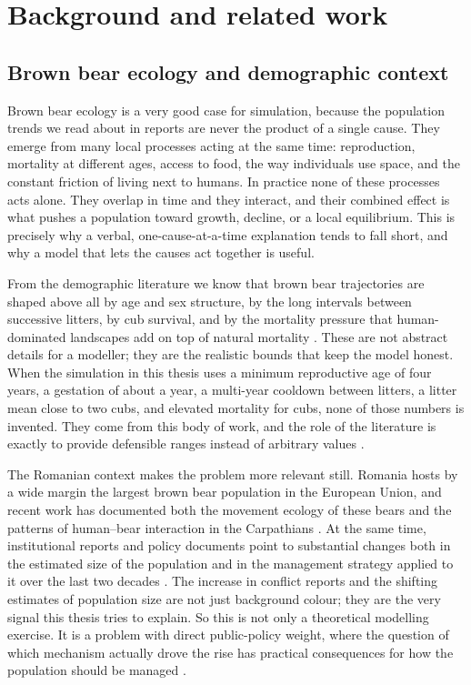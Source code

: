 \chapter{Background and related work}
\label{ch:background_related}

\section{Brown bear ecology and demographic context}

Brown bear ecology is a very good case for simulation, because the population trends we read about in reports are never the product of a single cause. They emerge from many local processes acting at the same time: reproduction, mortality at different ages, access to food, the way individuals use space, and the constant friction of living next to humans. In practice none of these processes acts alone. They overlap in time and they interact, and their combined effect is what pushes a population toward growth, decline, or a local equilibrium. This is precisely why a verbal, one-cause-at-a-time explanation tends to fall short, and why a model that lets the causes act together is useful.

From the demographic literature we know that brown bear trajectories are shaped above all by age and sex structure, by the long intervals between successive litters, by cub survival, and by the mortality pressure that human-dominated landscapes add on top of natural mortality \cite{Schwartz2003,Saether1998,Swenson1997}. These are not abstract details for a modeller; they are the realistic bounds that keep the model honest. When the simulation in this thesis uses a minimum reproductive age of four years, a gestation of about a year, a multi-year cooldown between litters, a litter mean close to two cubs, and elevated mortality for cubs, none of those numbers is invented. They come from this body of work, and the role of the literature is exactly to provide defensible ranges instead of arbitrary values \cite{Swenson2000}.

The Romanian context makes the problem more relevant still. Romania hosts by a wide margin the largest brown bear population in the European Union, and recent work has documented both the movement ecology of these bears and the patterns of human--bear interaction in the Carpathians \cite{Pop2018,Popescu2017}. At the same time, institutional reports and policy documents point to substantial changes both in the estimated size of the population and in the management strategy applied to it over the last two decades \cite{INCDS2023,MMAP2024}. The increase in conflict reports and the shifting estimates of population size are not just background colour; they are the very signal this thesis tries to explain. So this is not only a theoretical modelling exercise. It is a problem with direct public-policy weight, where the question of which mechanism actually drove the rise has practical consequences for how the population should be managed \cite{Chapron2014}.

